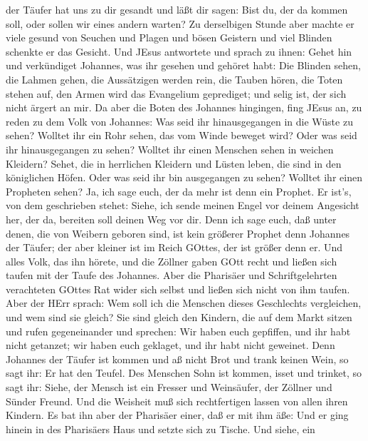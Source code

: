 der Täufer hat uns zu dir gesandt und läßt dir sagen: Bist du, der da
kommen soll, oder sollen wir eines andern warten?  Zu
derselbigen Stunde aber machte er viele gesund von Seuchen und Plagen
und bösen Geistern und viel Blinden schenkte er das Gesicht.
 Und JEsus antwortete und sprach zu ihnen: Gehet hin und
verkündiget Johannes, was ihr gesehen und gehöret habt: Die Blinden
sehen, die Lahmen gehen, die Aussätzigen werden rein, die Tauben hören,
die Toten stehen auf, den Armen wird das Evangelium geprediget;
 und selig ist, der sich nicht ärgert an mir. 
Da aber die Boten des Johannes hingingen, fing JEsus an, zu reden zu dem
Volk von Johannes: Was seid ihr hinausgegangen in die Wüste zu sehen?
Wolltet ihr ein Rohr sehen, das vom Winde beweget wird? 
Oder was seid ihr hinausgegangen zu sehen? Wolltet ihr einen Menschen
sehen in weichen Kleidern? Sehet, die in herrlichen Kleidern und Lüsten
leben, die sind in den königlichen Höfen.  Oder was seid
ihr bin ausgegangen zu sehen? Wolltet ihr einen Propheten sehen? Ja, ich
sage euch, der da mehr ist denn ein Prophet.  Er ist's, von
dem geschrieben stehet: Siehe, ich sende meinen Engel vor deinem
Angesicht her, der da, bereiten soll deinen Weg vor dir. 
Denn ich sage euch, daß unter denen, die von Weibern geboren sind, ist
kein größerer Prophet denn Johannes der Täufer; der aber kleiner ist im
Reich GOttes, der ist größer denn er.  Und alles Volk, das
ihn hörete, und die Zöllner gaben GOtt recht und ließen sich taufen mit
der Taufe des Johannes.  Aber die Pharisäer und
Schriftgelehrten verachteten GOttes Rat wider sich selbst und ließen
sich nicht von ihm taufen.  Aber der HErr sprach: Wem soll
ich die Menschen dieses Geschlechts vergleichen, und wem sind sie
gleich?  Sie sind gleich den Kindern, die auf dem Markt
sitzen und rufen gegeneinander und sprechen: Wir haben euch gepfiffen,
und ihr habt nicht getanzet; wir haben euch geklaget, und ihr habt nicht
geweinet.  Denn Johannes der Täufer ist kommen und aß nicht
Brot und trank keinen Wein, so sagt ihr: Er hat den Teufel.
 Des Menschen Sohn ist kommen, isset und trinket, so sagt
ihr: Siehe, der Mensch ist ein Fresser und Weinsäufer, der Zöllner und
Sünder Freund.  Und die Weisheit muß sich rechtfertigen
lassen von allen ihren Kindern.  Es bat ihn aber der
Pharisäer einer, daß er mit ihm äße: Und er ging hinein in des
Pharisäers Haus und setzte sich zu Tische.  Und siehe, ein
